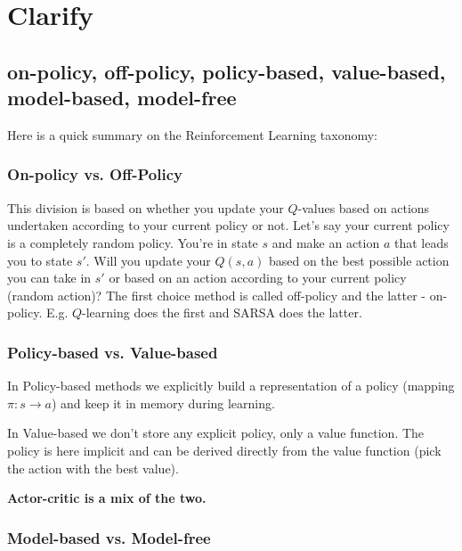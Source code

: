 

\section{Clarify}

\subsection{on-policy, off-policy, policy-based, value-based, model-based, model-free}


Here is a quick summary on the Reinforcement Learning taxonomy:

\subsubsection{On-policy vs. Off-Policy}

This division is based on whether you update your $Q$-values based on actions undertaken 
according to your current policy or not. Let's say your current policy is a completely 
random policy. You're in state $s$ and make an action $a$ that leads you to state $s′$. 
Will you update your $Q(s,a)$ based on the best possible action you can take in $s′$ or 
based on an action according to your current policy (random action)? The first choice 
method is called off-policy and the latter - on-policy. E.g. $Q$-learning does the first 
and SARSA does the latter.

\subsubsection{Policy-based vs. Value-based}

In Policy-based methods we explicitly build a representation of a policy (mapping $\pi: 
s \rightarrow a$) and keep it in memory during learning.

In Value-based we don't store any explicit policy, only a value function. The policy is 
here implicit and can be derived directly from the value function (pick the action with 
the best value).

{\bf Actor-critic is a mix of the two.}

\subsubsection{Model-based vs. Model-free}

